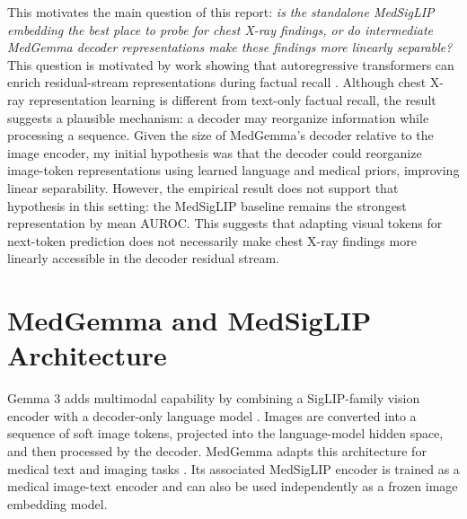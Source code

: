 \documentclass{article}
\begin{document}
This motivates the main question of this report:
\emph{is the standalone MedSigLIP embedding the best place to probe for chest X-ray findings, or do intermediate MedGemma decoder representations make these findings more linearly separable?}
This question is motivated by work showing that autoregressive transformers can enrich residual-stream representations during factual recall \citep{geva2023dissecting}.
Although chest X-ray representation learning is different from text-only factual recall, the result suggests a plausible mechanism: a decoder may reorganize information while processing a sequence.
Given the size of MedGemma's decoder relative to the image encoder, my initial hypothesis was that the decoder could reorganize image-token representations using learned language and medical priors, improving linear separability.
However, the empirical result does not support that hypothesis in this setting: the MedSigLIP baseline remains the strongest representation by mean AUROC.
This suggests that adapting visual tokens for next-token prediction does not necessarily make chest X-ray findings more linearly accessible in the decoder residual stream.

\section{MedGemma and MedSigLIP Architecture}

Gemma 3 adds multimodal capability by combining a SigLIP-family vision encoder with a decoder-only language model \citep{gemma32025}.
Images are converted into a sequence of soft image tokens, projected into the language-model hidden space, and then processed by the decoder.
MedGemma adapts this architecture for medical text and imaging tasks \citep{medgemma2025}.
Its associated MedSigLIP encoder is trained as a medical image-text encoder and can also be used independently as a frozen image embedding model.
\end{document}
